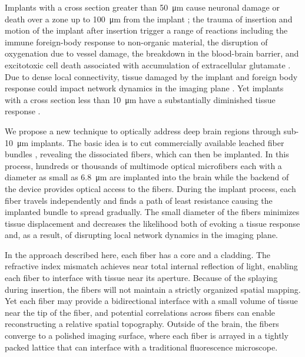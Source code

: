 Implants with a cross section 
greater than 50~\si{\micro\meter} cause neuronal damage or death over 
a zone up to 100~\si{\micro\meter} from the implant 
\cite{Seymour:2007dj}; the trauma of insertion and 
motion of the implant 
after insertion trigger a range of reactions including the immune 
foreign-body response to non-organic material, the disruption of 
oxygenation due to vessel damage, the breakdown in the blood-brain 
barrier, and excitotoxic cell death associated with accumulation of 
extracellular glutamate 
\cite{Szarowski:2003cz,Polikov:2005cq,McConnell:2009hr,Freire:2011gl}. 
Due to dense local connectivity, tissue damaged by the implant and 
foreign body response could impact network dynamics in the imaging 
plane \cite{Hayn:2015ew,Hayn:2017kj,GossVarley:2017kf}. Yet 
implants with a cross section less than 10~\si{\micro\meter} have a substantially 
diminished tissue response 
\cite{Seymour:2007dj,JohnPSeymour:2006td,Kozai:2012bp,Patel:2018cr}.

We propose a new technique to 
optically address deep brain regions through sub-10~\si{\micro\meter} 
implants. The basic idea is to cut commercially 
available leached fiber bundles \cite{Gerstner:2004to}, 
revealing the dissociated fibers, which can then be implanted. 
In this process, hundreds 
or thousands of multimode optical microfibers each with a diameter 
as small as 6.8~\si{\micro\meter} are implanted into the brain while the 
backend of the device provides optical access to the 
fibers. During the implant process, each fiber travels 
independently and finds a path of least resistance causing the 
implanted bundle to spread gradually. The small diameter of the 
fibers minimizes tissue displacement 
and decreases the likelihood both of evoking a tissue response and, 
as a result, of disrupting local network dynamics in the imaging plane.

In the approach described here, each fiber has a core and a cladding. 
The refractive index mismatch achieves near 
total internal reflection of light, enabling each fiber to interface with 
tissue near its aperture. Because of the 
splaying during insertion, the fibers will not maintain a strictly organized 
spatial mapping. Yet each fiber may provide a bidirectional interface 
with a small volume of tissue near the tip of the fiber, and potential 
correlations across fibers can enable reconstructing a relative spatial 
topography. Outside of the brain, the fibers converge to a polished 
imaging surface, where each fiber is arrayed in a tightly packed 
lattice that can interface with a traditional fluorescence microscope. 

